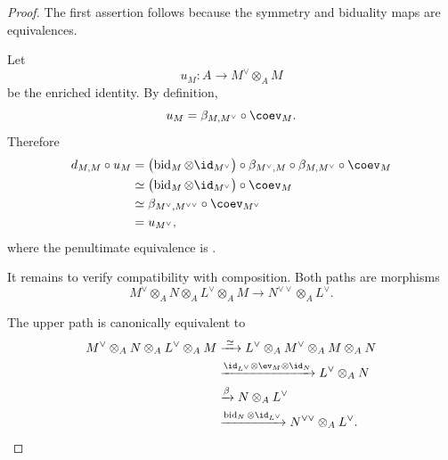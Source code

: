 \begin{proof}
The first assertion follows because the symmetry and biduality maps are
equivalences.

Let
\[
    u_M
    \colon
    A
    \longrightarrow
    M^\vee\otimes_A M
\]
be the enriched identity. By definition,
\[
    u_M
    =
    \beta_{M,M^\vee}
    \circ
    \coev_M.
\]
Therefore
\[
\begin{aligned}
    d_{M,M}\circ u_M
    &=
    \bigl(
        \operatorname{bid}_M
        \otimes
        \id_{M^\vee}
    \bigr)
    \circ
    \beta_{M^\vee,M}
    \circ
    \beta_{M,M^\vee}
    \circ
    \coev_M
    \\
    &\simeq
    \bigl(
        \operatorname{bid}_M
        \otimes
        \id_{M^\vee}
    \bigr)
    \circ
    \coev_M
    \\
    &\simeq
    \beta_{M^\vee,M^{\vee\vee}}
    \circ
    \coev_{M^\vee}
    \\
    &=
    u_{M^\vee},
\end{aligned}
\]
where the penultimate equivalence is
.

It remains to verify compatibility with composition. Both paths are
morphisms
\[
    M^\vee
    \otimes_A
    N
    \otimes_A
    L^\vee
    \otimes_A
    M
    \longrightarrow
    N^{\vee\vee}
    \otimes_A
    L^\vee.
\]

The upper path is canonically equivalent to
\[
\begin{aligned}
    M^\vee
    \otimes_A
    N
    \otimes_A
    L^\vee
    \otimes_A
    M
    &\xrightarrow{\;\simeq\;}
    L^\vee
    \otimes_A
    M^\vee
    \otimes_A
    M
    \otimes_A
    N
    \\
    &\xrightarrow{
        \id_{L^\vee}
        \otimes
        \ev_M
        \otimes
        \id_N
    }
    L^\vee\otimes_A N
    \\
    &\xrightarrow{\beta}
    N\otimes_A L^\vee
    \\
    &\xrightarrow{
        \operatorname{bid}_N
        \otimes
        \id_{L^\vee}
    }
    N^{\vee\vee}\otimes_A L^\vee.
\end{aligned}
\]


\end{proof}
